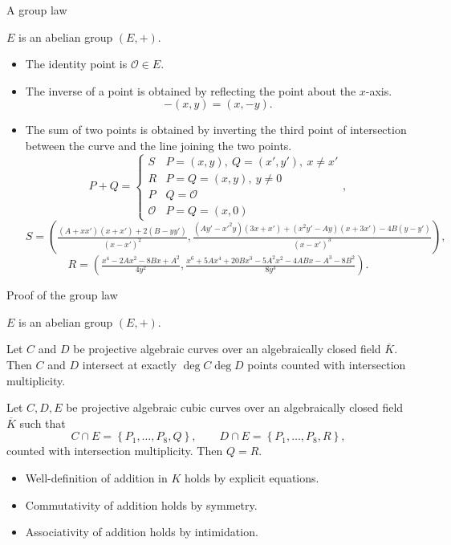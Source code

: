 \documentclass[8pt,t]{beamer}
\newcommand{\rb}[1]{\left( #1 \right)}
\newcommand{\cb}[1]{\left\{ #1 \right\}}
\newcommand{\Q}{\mathbb{Q}}
\newcommand{\OO}{\mathcal{O}}
\begin{document}
\begin{frame}{A group law}
\framebox[\linewidth]{$ E = \cb{\rb{x, y} \in \Q^2 \mid y^2 = x^3 + Ax + B} \cup \cb{\OO} $} \vspace{0.1cm} \\
\begin{theorem}
$ E $ is an abelian group $ \rb{E, +} $.
\begin{itemize}
\item<2-> The identity point is $ \OO \in E $.
\item<3-> The inverse of a point is obtained by reflecting the point about the $ x $-axis.
$$ -\rb{x, y} = \rb{x, -y}. $$
\item<4-> The sum of two points is obtained by inverting the third point of intersection between the curve and the line joining the two points.
$$ P + Q =
\begin{cases}
S & P = \rb{x, y}, \ Q = \rb{x', y'}, \ x \ne x' \\
R & P = Q = \rb{x, y}, \ y \ne 0 \\
P & Q = \OO \\
\OO & P = Q = \rb{x, 0}
\end{cases},
$$
$$ S = \rb{\tfrac{\rb{A + xx'}\rb{x + x'} + 2\rb{B - yy'}}{\rb{x - x'}^2}, \tfrac{\rb{Ay' - x'^2y}\rb{3x + x'} + \rb{x^2y' - Ay}\rb{x + 3x'} - 4B\rb{y - y'}}{\rb{x - x'}^3}}, $$
$$ R = \rb{\tfrac{x^4 - 2Ax^2 - 8Bx + A^2}{4y^2}, \tfrac{x^6 + 5Ax^4 + 20Bx^3 - 5A^2x^2 - 4ABx - A^3 - 8B^2}{8y^3}}. $$
\end{itemize}
\end{theorem}
\end{frame}

\begin{frame}{Proof of the group law}
\framebox[\linewidth]{$ E = \cb{\rb{x, y} \in \Q^2 \mid y^2 = x^3 + Ax + B} \cup \cb{\OO} $} \vspace{0.1cm} \\
\begin{theorem}
$ E $ is an abelian group $ \rb{E, +} $.
\end{theorem}
\pause
\begin{lemma}
Let $ C $ and $ D $ be projective algebraic curves over an algebraically closed field $ \overline{K} $. Then $ C $ and $ D $ intersect at exactly $ \deg C\deg D $ points counted with intersection multiplicity.
\end{lemma}
\pause
\begin{lemma}
Let $ C, D, E $ be projective algebraic cubic curves over an algebraically closed field $ \overline{K} $ such that
$$ C \cap E = \cb{P_1, \dots, P_8, Q}, \qquad D \cap E = \cb{P_1, \dots, P_8, R}, $$
counted with intersection multiplicity. Then $ Q = R $.
\end{lemma}
\pause
\begin{itemize}
\item<4-> Well-definition of addition in $ K $ holds by explicit equations.
\item<5-> Commutativity of addition holds by symmetry.
\item<6-> Associativity of addition holds by intimidation.
\end{itemize}
\end{frame}
\end{document}
